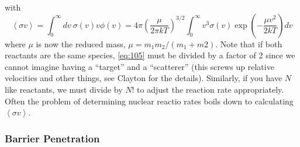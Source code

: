 \documentclass[10pt]{article}
\numberwithin{equation}{section}
\newcommand{\avg}[1]{\left\langle#1\right\rangle}
\begin{document}
  with
  \begin{equation}
    \label{eq:108}
    \avg{\sigma v}=\int_0^\infty dv\
    \sigma(v)v\phi(v)=4\pi\left(\frac{\mu}{2\pi kT}\right)^{3/2}
    \int_0^\infty v^3\sigma(v)\exp\left(-\frac{\mu v^2}{2kT}\right)dv
  \end{equation}
  where $\mu$ is now the reduced mass, $\mu=m_1m_2/(m_1+m2)$. Note that
  if both reactants are the same species, \eqref{eq:105}
  must be divided by a factor of 2 since we cannot imagine having a
  ``target'' and a ``scatterer'' (this screws up relative velocities
  and other things, see Clayton for the details). Similarly, if you
  have $N$ like reactants, we must divide by $N!$ to adjust the
  reaction rate appropriately. Often the problem of determining
  nuclear reactio rates boils down to calculating $\avg{\sigma v}$.

  \subsubsection{Barrier Penetration}
  \label{sec:barrier-penetration}
\end{document}
